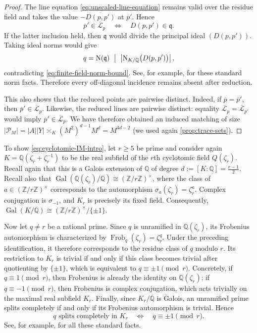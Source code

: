 \documentclass[11pt,reqno]{amsart}
\theoremstyle{definition}
\theoremstyle{remark}
\newcommand{\Q}{\mathbb{Q}}
\newcommand{\Z}{\mathbb{Z}}
\newcommand{\Norm}{\operatorname{N}}
\begin{document}
\begin{proof}
The line equation \eqref{eq:unscaled-line-equation} remains valid
over the residue field and takes the value
$-\overline{D(p,p')}$ at $\overline p'$. Hence
\begin{equation}
\label{eq:reduced-D-incidence}
        \overline p'\in\overline{\mathcal L}_p
        \quad\Longleftrightarrow\quad
        D(p,p')\in\mathfrak q.
\end{equation}
If the latter inclusion held, then $\mathfrak q$ would divide the
principal ideal $(D(p,p'))$. Taking ideal norms would give
\[
        q=\Norm(\mathfrak q)
        \ \bigm|\
        \left|\Norm_{K/\Q}\bigl(D(p,p')\bigr)\right|,
\]
contradicting \eqref{eq:finite-field-norm-bound}. See, for example,
\cite[Chapter~I]{Neukirch1999} for these standard norm facts. Therefore every off-diagonal incidence remains absent after reduction.

This also shows that the reduced points are pairwise distinct. Indeed,
if $\overline p=\overline p'$, then
$\overline p'\in\overline{\mathcal L}_p$. Likewise, the reduced lines
are pairwise distinct: equality
$\overline{\mathcal L}_p=\overline{\mathcal L}_{p'}$ would imply
$\overline p'\in\overline{\mathcal L}_p$. We have therefore obtained an induced matching of size $|\mathcal P_M| =|A||Y| \asymp_K (M^2)^{d-1}M^d =M^{3d-2}$ (we used again \cref{prop:trace-sets}). 
\end{proof}

To show \eqref{eq:cyclotomic-IM-intro}, let $r\ge5$ be prime and consider again $K=\Q(\zeta_r+\zeta_r^{-1})$ to be the real subfield of the $r$th cyclotomic field $Q(\zeta_r)$. Recall again that this is a Galois extension of $\Q$ of degree $d:=[K:\Q]=\frac{r-1}{2}$. Recall also that $\operatorname{Gal}(\Q(\zeta_r)/\Q) \cong(\Z/r\Z)^\times$, where the class of $a\in(\Z/r\Z)^\times$ corresponds to the automorphism $\sigma_a(\zeta_r)=\zeta_r^a$. Complex conjugation is $\sigma_{-1}$, and $K_r$ is precisely its fixed field. Consequently, $\operatorname{Gal}(K/\Q) \cong(\Z/r\Z)^\times/\{\pm1\}$.

Now let $q\ne r$ be a rational prime. Since $q$ is unramified in $\Q(\zeta_r)$, its Frobenius automorphism is characterized by $\operatorname{Frob}_q(\zeta_r)=\zeta_r^q$. Under the preceding identification, it therefore corresponds to the residue class of $q$ modulo $r$. Its restriction to $K_r$ is trivial if and only if this class becomes trivial after quotienting by $\{\pm1\}$, which is equivalent to $q\equiv\pm1\pmod r$. Concretely, if $q\equiv1\pmod r$, then Frobenius is already the identity on $\Q(\zeta_r)$; if $q\equiv-1\pmod r$, then Frobenius is complex conjugation, which acts trivially on the maximal real subfield $K_r$. Finally, since $K_r/\Q$ is Galois, an unramified prime splits completely if and only if its Frobenius automorphism is trivial. Hence \[ q\text{ splits completely in }K_r \quad\Longleftrightarrow\quad q\equiv\pm1\pmod r. \] See, for example, \cite[Chapter~2]{Washington1997} for all these standard facts. 
\end{document}

